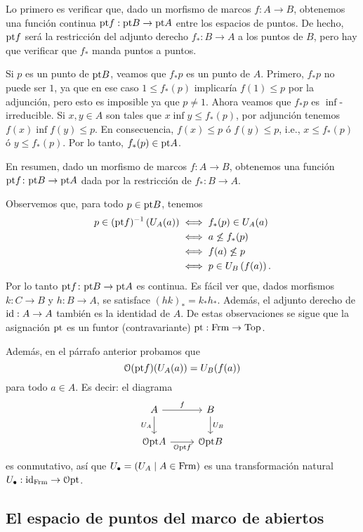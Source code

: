 Lo primero es verificar que, dado un morfismo de marcos $f:A\to B$,
obtenemos una función continua $\mathrm{pt} f:\mathrm{pt} B\to\mathrm{pt} A$ entre los
espacios de puntos. De hecho, $\mathrm{pt} f$ será la restricción del adjunto
derecho $f_*:B\to A$ a los puntos de $B$, pero hay que verificar que
$f_*$ manda puntos a puntos.

Si $p$ es un punto de $\mathrm{pt} B$, veamos que $f_*p$ es un punto de $A$.
Primero, $f_*p$ no puede ser $1$, ya que en ese caso $1\leq f_\ast(p)$
implicaría $f(1)\leq p$ por la adjunción, pero esto es imposible ya
que $p\neq 1$.
Ahora veamos que $f_*p$ es $\inf$-irreducible. Si $x,y\in A$ son tales
que $x\inf y\leq f_\ast(p)$, por adjunción tenemos $f(x)\inf f(y)\leq p$.
En consecuencia, $f(x)\leq p$ ó $f(y)\leq p$, i.e., $x\leq f_\ast (p)$
ó $y\leq f_\ast (p)$. Por lo tanto, $f_\ast (p)\in \mathrm{pt} A$.

En resumen, dado un morfismo de marcos $f\colon A\to B$, obtenemos una
función $\mathrm{pt} f \colon \mathrm{pt} B\to \mathrm{pt} A$ dada por la restricción de
$f_*:B\to A$.

Observemos que, para todo $p\in \mathcal{\mathrm{pt}} B$, tenemos
\begin{align*}
    p\in (\mathrm{pt} f)^{-1} \left(U_A(a)\right)&\iff f_\ast (p)\in U_A(a)\\
    &\iff a\not\leq f_\ast (p)\\
    &\iff f(a)\not\leq p\\
    &\iff p\in U_B\left(f(a)\right).
\end{align*}
Por lo tanto $\mathrm{pt} f\colon \mathrm{pt} B\to \mathrm{pt} A$ es continua.
Es fácil ver que, dados morfismos $k:C\to B$ y $h:B\to A$,
se satisface $(hk)_*=k_*h_*$.
Además, el adjunto derecho de $\mathrm{id}:A\to A$ también es la identidad
de $A$.
De estas observaciones se sigue que la asignación $\mathrm{pt}$
es un funtor (contravariante) $\mathrm{pt}:\mathrm{Frm}\to\mathrm{Top}$.

Además, en el párrafo anterior probamos que
\[
    \mathcal{O}(\mathrm{pt} f)(U_A(a)) = U_B(f(a))
\]
para todo $a\in A$.
Es decir: el diagrama
\[
    \begin{tikzcd}
        A \ar[r,"f"] \ar[d,"U_A"'] & B \ar[d,"U_B"] \\
        \cal O\pt A \ar[r,"\cal O\pt f"'] & \cal O\pt B
    \end{tikzcd}
\]
es conmutativo, así que $U_\bullet=(U_A\mid A\in\mathrm{Frm})$
es una transformación
natural $U_\bullet:\mathrm{id}_{\mathrm{Frm}}\to\mathcal{O}\mathrm{pt}$.

\subsection{El espacio de puntos del marco de abiertos}

